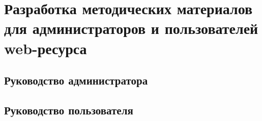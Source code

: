 \section{Разработка методических материалов для администраторов и пользователей web-ресурса}
    \subsection{Руководство администратора}

    \subsection{Руководство пользователя}

\clearpage
